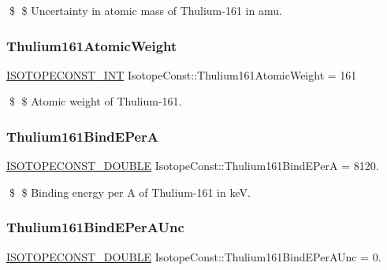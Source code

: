 \$ \$ Uncertainty in atomic mass of Thulium-\/161 in amu. \mbox{\label{group___isotope_const-_thulium-_tm161_gac05fd5897a5e33ba25adc55ae90738b2}} 
\subsubsection{\texorpdfstring{Thulium161\+Atomic\+Weight}{Thulium161AtomicWeight}}
{\footnotesize\ttfamily \mbox{\hyperlink{group___isotope_const-_macros_ga5f18360b3e99483a35c32d789e62621c}{I\+S\+O\+T\+O\+P\+E\+C\+O\+N\+S\+T\+\_\+\+I\+NT}} Isotope\+Const\+::\+Thulium161\+Atomic\+Weight = 161}

\$ \$ Atomic weight of Thulium-\/161. \mbox{\label{group___isotope_const-_thulium-_tm161_gaa497067e65ee284ece10813e076076ad}} 
\subsubsection{\texorpdfstring{Thulium161\+Bind\+E\+PerA}{Thulium161BindEPerA}}
{\footnotesize\ttfamily \mbox{\hyperlink{group___isotope_const-_macros_ga8f45a7272ce02c0b4c65c44636ed719a}{I\+S\+O\+T\+O\+P\+E\+C\+O\+N\+S\+T\+\_\+\+D\+O\+U\+B\+LE}} Isotope\+Const\+::\+Thulium161\+Bind\+E\+PerA = 8120.}

\$ \$ Binding energy per A of Thulium-\/161 in keV. \mbox{\label{group___isotope_const-_thulium-_tm161_gac8a5f11b3c98df2d1fbc7f514dc725d2}} 
\subsubsection{\texorpdfstring{Thulium161\+Bind\+E\+Per\+A\+Unc}{Thulium161BindEPerAUnc}}
{\footnotesize\ttfamily \mbox{\hyperlink{group___isotope_const-_macros_ga8f45a7272ce02c0b4c65c44636ed719a}{I\+S\+O\+T\+O\+P\+E\+C\+O\+N\+S\+T\+\_\+\+D\+O\+U\+B\+LE}} Isotope\+Const\+::\+Thulium161\+Bind\+E\+Per\+A\+Unc = 0.}

